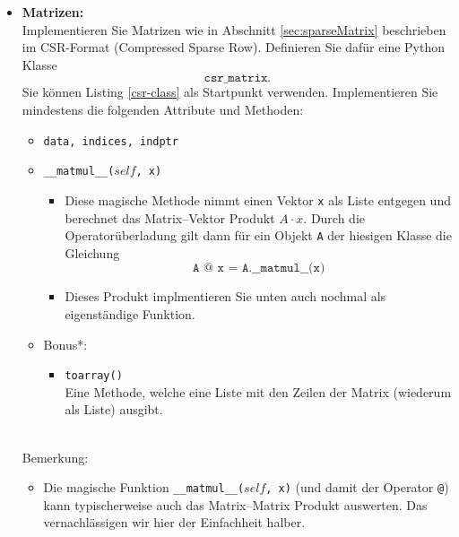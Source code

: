 \begin{itemize}
	\item \textbf{Matrizen:}\\ Implementieren Sie Matrizen wie in Abschnitt \ref{sec:sparseMatrix} beschrieben im CSR-Format (Compressed Sparse Row). Definieren Sie dafür eine Python Klasse $$\texttt{csr\_matrix}.$$ Sie können Listing \ref{csr-class} als Startpunkt verwenden. Implementieren Sie mindestens die folgenden Attribute und Methoden:
	      \begin{itemize}
		      \item \texttt{data, indices, indptr}
		      \item \texttt{\_\_matmul\_\_($self$, x)}
		            \begin{itemize}
			            \item Diese magische Methode nimmt einen Vektor \texttt{x} als Liste entgegen und berechnet das Matrix--Vektor Produkt $A\cdot x$. Durch die Operatorüberladung gilt dann für ein Objekt \texttt{A} der hiesigen Klasse die Gleichung
			                  $$\texttt{A @ x = A.\_\_matmul\_\_(x)} $$
			            \item Dieses Produkt implmentieren Sie unten auch nochmal als eigenständige Funktion.
		            \end{itemize}
		      \item Bonus*:
		            \begin{itemize}
			            \item \texttt{toarray()}\\
			                  Eine Methode, welche eine Liste mit den Zeilen der Matrix (wiederum als Liste) ausgibt.
		            \end{itemize}
	      \end{itemize}
	      {
	      ~\\
	      Bemerkung:
	      \begin{itemize}
		      \item Die magische Funktion \texttt{\_\_matmul\_\_($self$, x)} (und damit der Operator \texttt{@}) kann typischerweise auch das Matrix--Matrix Produkt auswerten. Das vernachlässigen wir hier der Einfachheit halber.
	      \end{itemize}}

\end{itemize}





